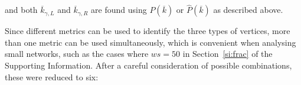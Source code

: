 \documentclass[%
	aip,
	jmp,%
	amsmath,amssymb,
	reprint,%
]{revtex4-1}
\begin{document}
																																																																																\noindent and both $\overline{k}_{\gamma,L}$ and $\overline{k}_{\gamma,R}$ are found using $P(\overline{k})$ or $\hat{P}(\overline{k})$ as described above.

																																																																																Since different metrics can be used to identify the three types of vertices, more than one metric can be used simultaneously, which is convenient when analysing small networks,
																																																																																such as the cases where $ws=50$ in Section~\ref{si:frac} of the Supporting Information.
																																																																																After a careful consideration of possible combinations, these were reduced to six:
\end{document}
